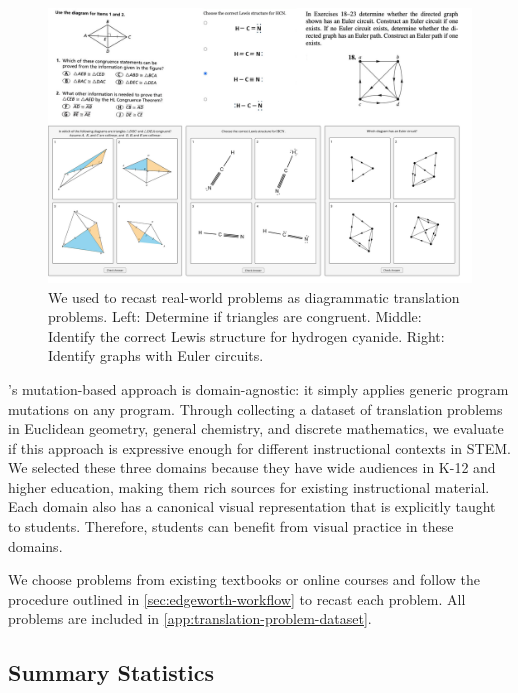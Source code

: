 \begin{figure}
    \centering
    \includegraphics[width=\linewidth]{assets/edgeworth/problem-samples.pdf}
    \caption{We used \Edgeworth to recast real-world problems as diagrammatic translation problems. Left: \textmd{Determine if triangles are congruent.}  Middle: \textmd{Identify the correct Lewis structure for hydrogen cyanide.} Right: \textmd{Identify graphs with Euler circuits.}}
    \label{fig:edgeworth-problems}
\end{figure}

\Edgeworth's mutation-based approach is domain-agnostic: it simply applies generic program mutations on any \Substance program. Through collecting a dataset of translation problems in Euclidean geometry, general chemistry, and discrete mathematics, we evaluate if this approach is expressive enough for different instructional contexts in STEM. We selected these three domains because they have wide audiences in K-12 and higher education, making them rich sources for existing instructional material. Each domain also has a canonical visual representation that is explicitly taught to students. Therefore, students can benefit from visual practice in these domains.

We choose problems from existing textbooks or online courses and follow the procedure outlined in \cref{sec:edgeworth-workflow} to recast each problem. All problems are included in \cref{app:translation-problem-dataset}.

\subsection{Summary Statistics}
\label{sec:edgeworth-case-studies-summary}

